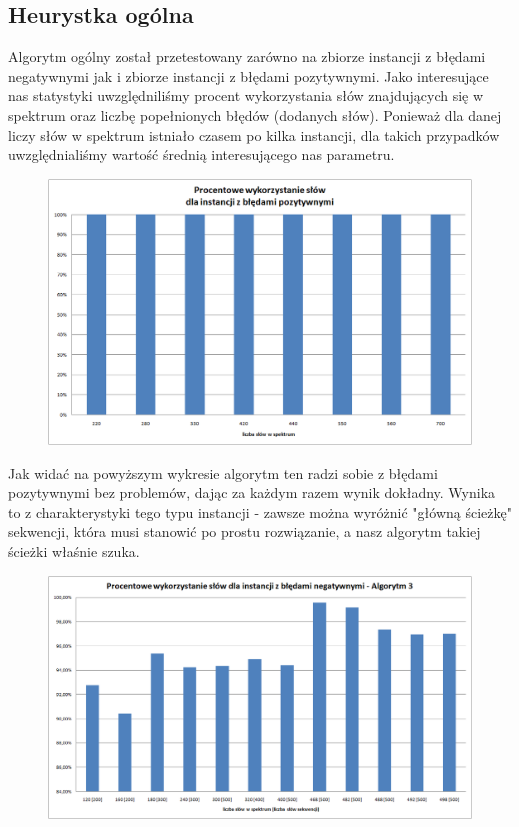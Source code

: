 \documentclass[a4paper,10pt]{article}
\begin{document}
\subsection{Heurystka ogólna}

Algorytm ogólny został przetestowany zarówno na zbiorze instancji z błędami negatywnymi jak i zbiorze instancji z błędami pozytywnymi. Jako interesujące nas statystyki uwzględniliśmy procent wykorzystania słów znajdujących się w spektrum oraz liczbę popełnionych błędów (dodanych słów). Ponieważ dla danej liczy słów w spektrum istniało czasem po kilka instancji, dla takich przypadków uwzględnialiśmy wartość średnią interesującego nas parametru.

\begin{figure}[h]
  \footnotesize\centering
  \includegraphics[width=\textwidth,keepaspectratio]{percentageUsedWords_general_positive.png}
\end{figure}

Jak widać na powyższym wykresie algorytm ten radzi sobie z błędami pozytywnymi bez problemów, dając za każdym razem wynik dokładny. Wynika to z charakterystyki tego typu instancji - zawsze można wyróżnić "główną ścieżkę" sekwencji, która musi stanowić po prostu rozwiązanie, a nasz algorytm takiej ścieżki właśnie szuka.

\begin{figure}[h]
  \footnotesize\centering
  \includegraphics[width=\textwidth,keepaspectratio]{percentageUsedWords_general_negative.png}
\end{figure}
\end{document}
